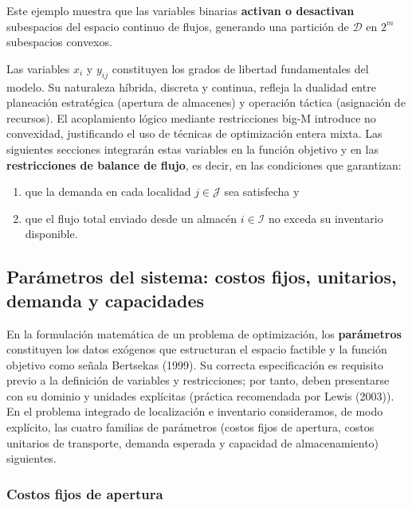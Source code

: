 \documentclass[
  spanish,
  us-letterpaper,
]{scrreprt}
\providecommand{\tightlist}{%
  \setlength{\itemsep}{0pt}\setlength{\parskip}{0pt}}
\numberwithin{equation}{section}
\begin{document}
Este ejemplo muestra que las variables binarias \textbf{activan o
desactivan} subespacios del espacio continuo de flujos, generando una
partición de \(\mathcal{D}\) en \(2^m\) subespacios convexos.

Las variables \(x_i\) y \(y_{ij}\) constituyen los grados de libertad
fundamentales del modelo. Su naturaleza híbrida, discreta y continua,
refleja la dualidad entre planeación estratégica (apertura de almacenes)
y operación táctica (asignación de recursos). El acoplamiento lógico
mediante restricciones big-M introduce no convexidad, justificando el
uso de técnicas de optimización entera mixta. Las siguientes secciones
integrarán estas variables en la función objetivo y en las
\textbf{restricciones de balance de flujo}, es decir, en las condiciones
que garantizan:

\begin{enumerate}
\def\labelenumi{(\roman{enumi})}
\tightlist
\item
  que la demanda en cada localidad \(j \in \mathcal{J}\) sea satisfecha
  y
\item
  que el flujo total enviado desde un almacén \(i \in \mathcal{I}\) no
  exceda su inventario disponible.
\end{enumerate}

\subsection{Parámetros del sistema: costos fijos, unitarios, demanda y
capacidades}\label{paruxe1metros-del-sistema-costos-fijos-unitarios-demanda-y-capacidades}

En la formulación matemática de un problema de optimización, los
\textbf{parámetros} constituyen los datos exógenos que estructuran el
espacio factible y la función objetivo como señala Bertsekas (1999). Su
correcta especificación es requisito previo a la definición de variables
y restricciones; por tanto, deben presentarse con su dominio y unidades
explícitas (práctica recomendada por Lewis (2003)). En el problema
integrado de localización e inventario consideramos, de modo explícito,
las cuatro familias de parámetros (costos fijos de apertura, costos
unitarios de transporte, demanda esperada y capacidad de almacenamiento)
siguientes.

\subsubsection{Costos fijos de apertura}\label{costos-fijos-de-apertura}
\end{document}
